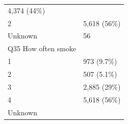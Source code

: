 \documentclass[]{article}
\begin{document}
\begin{longtable}[]{@{}ll@{}}
\begin{minipage}[t]{0.23\columnwidth}
4,374 (44\%)\strut
\end{minipage}\tabularnewline
\begin{minipage}[t]{0.71\columnwidth}\raggedright
2\strut
\end{minipage} & \begin{minipage}[t]{0.23\columnwidth}\raggedright
5,618 (56\%)\strut
\end{minipage}\tabularnewline
\begin{minipage}[t]{0.71\columnwidth}\raggedright
Unknown\strut
\end{minipage} & \begin{minipage}[t]{0.23\columnwidth}\raggedright
56\strut
\end{minipage}\tabularnewline
\begin{minipage}[t]{0.71\columnwidth}\raggedright
Q35 How often smoke\strut
\end{minipage} & \begin{minipage}[t]{0.23\columnwidth}\raggedright
\strut
\end{minipage}\tabularnewline
\begin{minipage}[t]{0.71\columnwidth}\raggedright
1\strut
\end{minipage} & \begin{minipage}[t]{0.23\columnwidth}\raggedright
973 (9.7\%)\strut
\end{minipage}\tabularnewline
\begin{minipage}[t]{0.71\columnwidth}\raggedright
2\strut
\end{minipage} & \begin{minipage}[t]{0.23\columnwidth}\raggedright
507 (5.1\%)\strut
\end{minipage}\tabularnewline
\begin{minipage}[t]{0.71\columnwidth}\raggedright
3\strut
\end{minipage} & \begin{minipage}[t]{0.23\columnwidth}\raggedright
2,885 (29\%)\strut
\end{minipage}\tabularnewline
\begin{minipage}[t]{0.71\columnwidth}\raggedright
4\strut
\end{minipage} & \begin{minipage}[t]{0.23\columnwidth}\raggedright
5,618 (56\%)\strut
\end{minipage}\tabularnewline
\begin{minipage}[t]{0.71\columnwidth}\raggedright
Unknown\strut
\end{minipage} & \begin{minipage}[t]{0.23\columnwidth}\raggedright

\end{minipage}
\end{longtable}
\end{document}
